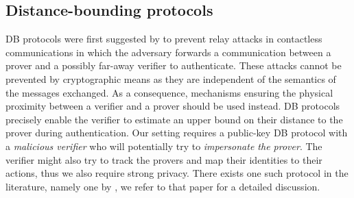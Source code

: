 \subsection{Distance-bounding protocols}%
\label{distance-bounding}

\Ac{DB} protocols were first suggested by \citet{DistanceBounding} to prevent relay attacks in contactless communications in which the adversary forwards a communication between a prover and a possibly far-away verifier to authenticate. 
These attacks cannot be prevented by cryptographic means as they are independent of the semantics of the messages exchanged.
As a consequence, mechanisms ensuring the physical proximity between a verifier and a prover should be used instead.
\Ac{DB} protocols precisely enable the verifier to estimate an upper bound on 
their distance to the prover during authentication.
%
Our setting requires a public-key \ac{DB} protocol with a \emph{malicious 
verifier} who will potentially try to \emph{impersonate the prover}.
The verifier might also try to track the provers and map their identities to 
their actions, thus we also require strong privacy.
There exists one such protocol in the literature, namely one by 
\textcite{DB-Schnorr}, we refer to that paper for a detailed discussion.

